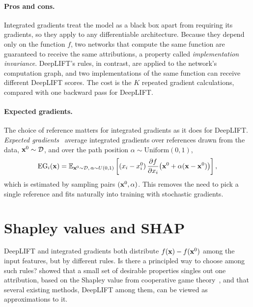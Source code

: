 \paragraph{Pros and cons.} Integrated gradients treat the model as a black box apart from requiring its gradients, so they apply to any differentiable architecture. Because they depend only on the function $f$, two networks that compute the same function are guaranteed to receive the same attributions, a property called \emph{implementation invariance}. DeepLIFT's rules, in contrast, are applied to the network's computation graph, and two implementations of the same function can receive different DeepLIFT scores. The cost is the $K$ repeated gradient calculations, compared with one backward pass for DeepLIFT.

\paragraph{Expected gradients.} The choice of reference matters for integrated gradients as it does for DeepLIFT. \emph{Expected gradients}~\citep{erion2021} average integrated gradients over references drawn from the data, $\mathbf{x}^0\sim\mathcal{D}$, and over the path position $\alpha\sim\mathrm{Uniform}(0,1)$,
\begin{equation}
  \mathrm{EG}_i(\mathbf{x}) = \mathbb{E}_{\mathbf{x}^0\sim\mathcal{D},\,\alpha\sim U(0,1)}\left[(x_i-x_i^0)\,\frac{\partial f}{\partial x_i}\big(\mathbf{x}^0+\alpha(\mathbf{x}-\mathbf{x}^0)\big)\right],
\end{equation}
which is estimated by sampling pairs $(\mathbf{x}^0,\alpha)$. This removes the need to pick a single reference and fits naturally into training with stochastic gradients.

\section{Shapley values and SHAP}
\label{sec:shap}

DeepLIFT and integrated gradients both distribute $f(\mathbf{x})-f(\mathbf{x}^0)$ among the input features, but by different rules. Is there a principled way to choose among such rules? \citet{lundberg2017} showed that a small set of desirable properties singles out one attribution, based on the Shapley value from cooperative game theory~\citep{shapley1953}, and that several existing methods, DeepLIFT among them, can be viewed as approximations to it.

